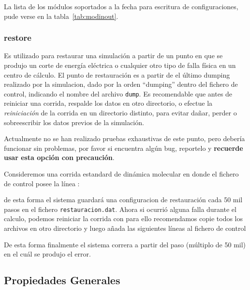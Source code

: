 La lista de los m\'odulos soportados a la fecha para escritura de configuraciones, pude verse en la tabla~\ref{tab:modinout}.

\subsubsection{restore}\label{fich:restauracion}
Es utilizado para restaurar una simulaci\'on a partir de un punto en que se produjo un corte de energ\'ia el\'ectrica o cualquier otro tipo de falla f\'isica en un centro de c\'alculo. El punto de restauraci\'on es a partir de el \'ultimo dumping realizado por la simulacion, dado por la orden ``dumping'' dentro del fichero de control, indicando el nombre del archivo \verb|dump|. Es recomendable que antes de reiniciar una corrida, respalde los datos en otro directorio, o efectue la \textit{reiniciaci\'on} de la corrida en un directorio distinto, para evitar da\~nar, perder o sobreescribir los datos previos de la simulaci\'on.

Actualmente no se han realizado pruebas exhaustivas de este punto, pero deber\'ia funcionar sin problemas, por favor si encuentra alg\'un bug, reportelo y \textbf{recuerde usar esta opci\'on con precauci\'on}.

Consideremos una corrida estandard de din\'amica molecular en donde el fichero de control posee la l\'inea :


\noindent
de esta forma el sistema guardar\'a una configuracion de restauraci\'on cada 50 mil pasos en el fichero \verb|restauracion.dat|. Ahora si ocurri\'o alguna falla durante el calculo, podemos reiniciar la corrida con {\lpmd} para ello recomendamos copie todos los archivos en otro directorio y luego añada las siguientes l\'ineas al fichero de control


De esta forma finalmente el sistema correra a partir del paso (m\'ultiplo de 50 mil) en el cu\'al se produjo el error.

\subsection{Propiedades Generales}
